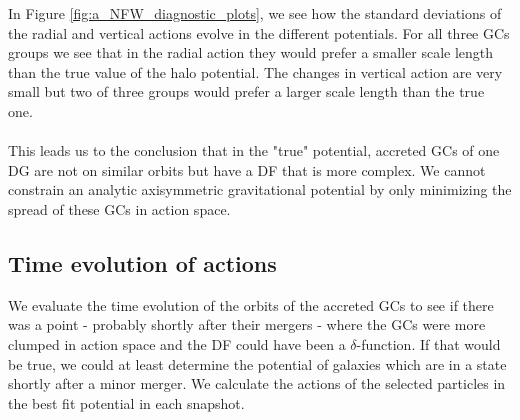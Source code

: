 In Figure \ref{fig:a_NFW_diagnostic_plots}, we see how the standard deviations of the radial and vertical actions evolve in the different potentials. For all three \acp{GC} groups we see that in the radial action they would prefer a smaller scale length than the true value of the halo potential. The changes in vertical action are very small but two of three groups would prefer a larger scale length than the true one. 
\\\\This leads us to the conclusion that in the "true" potential, accreted \acp{GC} of one \ac{DG} are not on similar orbits but have a \ac{DF} that is more complex. We cannot constrain an analytic axisymmetric gravitational potential by only minimizing the spread of these \acp{GC} in action space.

\subsection{Time evolution of actions}\label{subsec:time_evo_actions}
We evaluate the time evolution of the orbits of the accreted \acp{GC} to see if there was a point - probably shortly after their mergers - where the \acp{GC} were more clumped in action space and the \ac{DF} could have been a $\delta$-function. If that would be true, we could at least determine the potential of galaxies which are in a state shortly after a minor merger. We calculate the actions of the selected particles in the best fit potential in each snapshot.  

